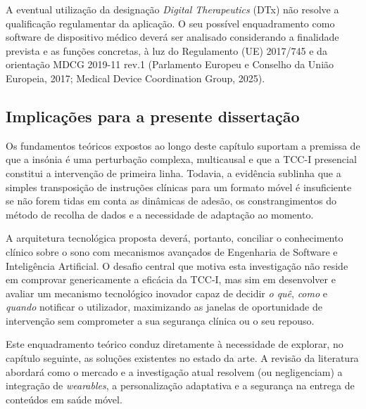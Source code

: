 A eventual utilização da designação \textit{Digital Therapeutics} (DTx) não resolve a qualificação regulamentar da aplicação. O seu possível enquadramento como software de dispositivo médico deverá ser analisado considerando a finalidade prevista e as funções concretas, à luz do Regulamento (UE) 2017/745 e da orientação MDCG 2019-11 rev.1 (Parlamento Europeu e Conselho da União Europeia, 2017; Medical Device Coordination Group, 2025).

\subsection{Implicações para a presente dissertação}
\label{sec:chap2_implicacoesDigitais}

Os fundamentos teóricos expostos ao longo deste capítulo suportam a premissa de que a insónia é uma perturbação complexa, multicausal e que a TCC-I presencial constitui a intervenção de primeira linha. Todavia, a evidência sublinha que a simples transposição de instruções clínicas para um formato móvel é insuficiente se não forem tidas em conta as dinâmicas de adesão, os constrangimentos do método de recolha de dados e a necessidade de adaptação ao momento.   

A arquitetura tecnológica proposta deverá, portanto, conciliar o conhecimento clínico sobre o sono com mecanismos avançados de Engenharia de Software e Inteligência Artificial. O desafio central que motiva esta investigação não reside em comprovar genericamente a eficácia da TCC-I, mas sim em desenvolver e avaliar um mecanismo tecnológico inovador capaz de decidir \textit{o quê}, \textit{como} e \textit{quando} notificar o utilizador, maximizando as janelas de oportunidade de intervenção sem comprometer a sua segurança clínica ou o seu repouso.   

Este enquadramento teórico conduz diretamente à necessidade de explorar, no capítulo seguinte, as soluções existentes no estado da arte. A revisão da literatura abordará como o mercado e a investigação atual resolvem (ou negligenciam) a integração de \textit{wearables}, a personalização adaptativa e a segurança na entrega de conteúdos em saúde móvel.  
 
